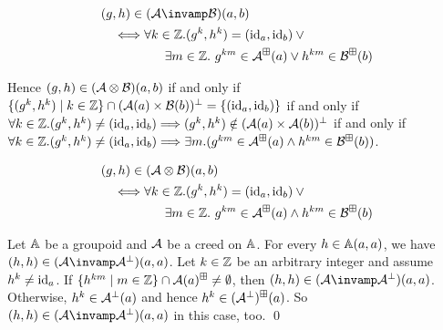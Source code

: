 \begin{align*}
    & (g,h) \in (\creed \llpar \creedb)(a,b)
    \\ &
    \quad\Longleftrightarrow
    \forall k \in \Int. (g^k, h^k) = (\ident_a, \ident_b) \vee {}
    \\ &
    \quad\qquad\qquad \exists m \in \Int.\ g^{km} \in \creed^{\boxplus}(a) \vee h^{km} \in \creedb^
    {\boxplus}(b)
\end{align*}

Hence \( (g, h) \in (\mathcal{A} \otimes \mathcal{B})(a,b) \) if and only if \( \{ (g^k, h^k) \mid k \in \mathbb{Z} \} \cap (\mathcal{A}(a) \times \mathcal{B}(b))^\bot = \{ (\mathrm{id}_a, \mathrm{id}_b) \} \) if and only if \( \forall k \in \mathbb{Z}. (g^k, h^k) \neq (\mathrm{id}_a, \mathrm{id}_b) \Longrightarrow (g^k, h^k) \notin (\mathcal{A}(a) \times \mathcal{A}(b))^\bot \) if and only if \( \forall k \in \mathbb{Z}. (g^k, h^k) \neq (\mathrm{id}_a, \mathrm{id}_b) \Longrightarrow \exists m. (g^{km} \in \mathcal{A}^\boxplus(a) \wedge h^{km} \in \mathcal{B}^\boxplus(b)) \).

\begin{align*}
    & (g,h) \in (\mathcal{A} \otimes \mathcal{B})(a,b)
    \\ &
    \quad\Longleftrightarrow
    \forall k \in \mathbb{Z}. (g^k, h^k) = (\mathrm{id}_a, \mathrm{id}_b) \vee {}
    \\ &
    \quad\qquad\qquad \exists m \in \mathbb{Z}.\ g^{km} \in \mathcal{A}^{\boxplus}(a) \wedge h^{km} \in \mathcal{B}^
    {\boxplus}(b)
\end{align*}

\begin{example}
    Let \( \mathbb{A} \) be a groupoid and \( \mathcal{A} \) be a creed on \( \mathbb{A} \).
    For every \( h \in \mathbb{A}(a,a) \), we have \( (h,h) \in (\creed \llpar \creed^{\bot})(a,a) \).
    Let \( k \in \mathbb{Z} \) be an arbitrary integer and assume \( h^k \neq \mathrm{id}_a \).
    If \( \{ h^{km} \mid m \in \mathbb{Z} \} \cap \mathcal{A}(a)^\boxplus \neq \emptyset \), then \( (h,h) \in (\creed \llpar \creed^{\bot})(a,a) \).
    Otherwise, \( h^{k} \in \mathcal{A}^\bot(a) \) and hence \( h^k \in (\mathcal{A}^\bot)^\boxplus(a) \).
    So \( (h,h) \in (\creed \llpar \creed^{\bot})(a,a) \) in this case, too.
    \qed
\end{example}


